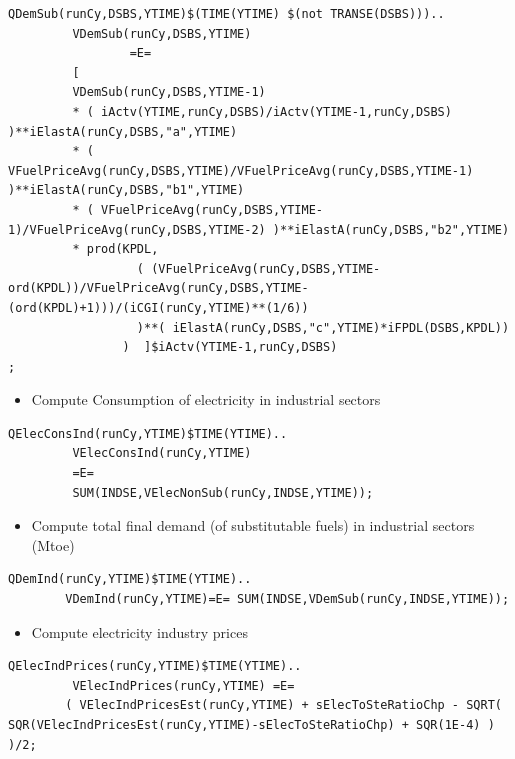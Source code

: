 \documentclass[a4paper,]{scrartcl}
\providecommand{\tightlist}{%
  \setlength{\itemsep}{0pt}\setlength{\parskip}{0pt}}
\begin{document}
\begin{lstlisting}
QDemSub(runCy,DSBS,YTIME)$(TIME(YTIME) $(not TRANSE(DSBS)))..
         VDemSub(runCy,DSBS,YTIME)
                 =E=
         [
         VDemSub(runCy,DSBS,YTIME-1)
         * ( iActv(YTIME,runCy,DSBS)/iActv(YTIME-1,runCy,DSBS) )**iElastA(runCy,DSBS,"a",YTIME)
         * ( VFuelPriceAvg(runCy,DSBS,YTIME)/VFuelPriceAvg(runCy,DSBS,YTIME-1) )**iElastA(runCy,DSBS,"b1",YTIME)
         * ( VFuelPriceAvg(runCy,DSBS,YTIME-1)/VFuelPriceAvg(runCy,DSBS,YTIME-2) )**iElastA(runCy,DSBS,"b2",YTIME)
         * prod(KPDL,
                  ( (VFuelPriceAvg(runCy,DSBS,YTIME-ord(KPDL))/VFuelPriceAvg(runCy,DSBS,YTIME-(ord(KPDL)+1)))/(iCGI(runCy,YTIME)**(1/6))
                  )**( iElastA(runCy,DSBS,"c",YTIME)*iFPDL(DSBS,KPDL))
                )  ]$iActv(YTIME-1,runCy,DSBS)
;
\end{lstlisting}

\begin{itemize}
\tightlist
\item
  Compute Consumption of electricity in industrial sectors
\end{itemize}

\begin{lstlisting}
QElecConsInd(runCy,YTIME)$TIME(YTIME)..
         VElecConsInd(runCy,YTIME)
         =E=
         SUM(INDSE,VElecNonSub(runCy,INDSE,YTIME));       
\end{lstlisting}

\begin{itemize}
\tightlist
\item
  Compute total final demand (of substitutable fuels) in industrial
  sectors (Mtoe)
\end{itemize}

\begin{lstlisting}
QDemInd(runCy,YTIME)$TIME(YTIME)..
        VDemInd(runCy,YTIME)=E= SUM(INDSE,VDemSub(runCy,INDSE,YTIME));
\end{lstlisting}

\begin{itemize}
\tightlist
\item
  Compute electricity industry prices
\end{itemize}

\begin{lstlisting}
QElecIndPrices(runCy,YTIME)$TIME(YTIME)..
         VElecIndPrices(runCy,YTIME) =E=
        ( VElecIndPricesEst(runCy,YTIME) + sElecToSteRatioChp - SQRT( SQR(VElecIndPricesEst(runCy,YTIME)-sElecToSteRatioChp) + SQR(1E-4) ) )/2;
\end{lstlisting}
\end{document}
